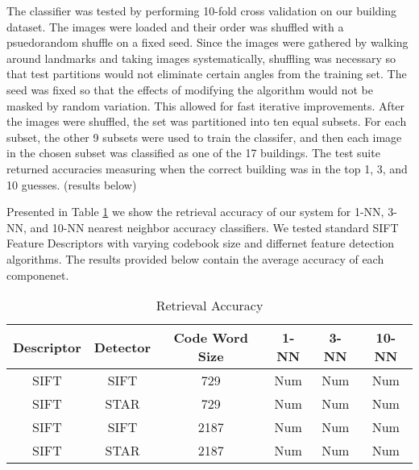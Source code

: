 The classifier was tested by performing 10-fold cross validation on our building dataset. 
The images were loaded and their order was shuffled with a psuedorandom shuffle on a fixed seed. 
Since the images were gathered by walking around landmarks and taking images systematically, shuffling was necessary so that test partitions would not eliminate certain angles from the training set. 
The seed was fixed so that the effects of modifying the algorithm would not be masked by random variation. This allowed for fast iterative improvements. After the images were shuffled, the set was partitioned into ten equal subsets. 
For each subset, the other 9 subsets were used to train the classifer, and then  each image in the chosen subset was classified as one of the 17 buildings. 
The test suite returned accuracies measuring when the correct building was in the top 1, 3, and 10 guesses. (results below)


Presented in Table \ref{tab:results} we show the retrieval accuracy of our system for 1-NN, 3-NN, and 10-NN nearest neighbor accuracy classifiers.
We tested standard SIFT Feature Descriptors with varying codebook size and differnet feature detection algorithms.
The results provided below contain the average accuracy of each componenet.

\begin{table}[h]
\begin{center}
\caption{Retrieval Accuracy}
\label{tab:results}
\begin{tabular}{| c | c | c | c | c | c |}
\hline
Descriptor & Detector & Code Word Size & 1-NN & 3-NN & 10-NN\\ \hline
SIFT & SIFT & 729 & Num & Num & Num \\ \hline
SIFT & STAR & 729 & Num & Num & Num \\ \hline
SIFT & SIFT & 2187 & Num & Num & Num \\ \hline
SIFT & STAR & 2187 & Num & Num & Num\\ \hline
\end{tabular}
\end{center}
\end{table}
